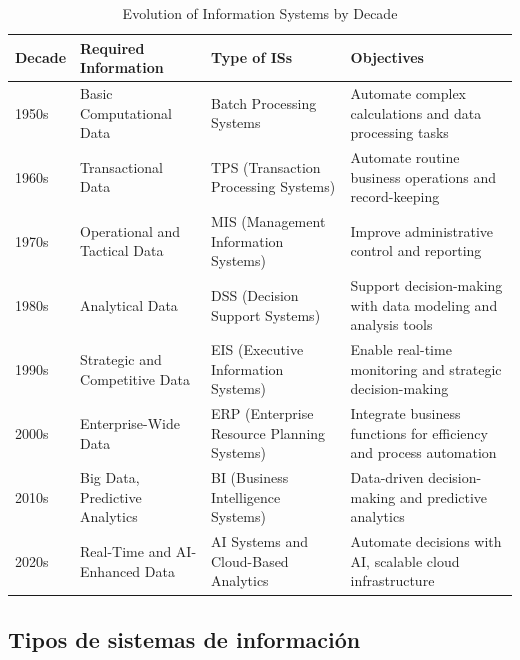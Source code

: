 \begin{table}[ht]
\centering
\begin{tabular}{p{1.5cm}p{3.5cm}p{3.5cm}p{4cm}}
\hline
\rowcolor{gray!50}
\textbf{Decade} & \textbf{Required Information} & \textbf{Type of ISs} & \textbf{Objectives} \\ \hline
\footnotesize 1950s & \footnotesize Basic Computational Data & \footnotesize Batch Processing Systems & \footnotesize Automate complex calculations and data processing tasks \\ \hline
\rowcolor{gray!10} \footnotesize 1960s & \footnotesize Transactional Data & \footnotesize TPS (Transaction Processing Systems) & \footnotesize Automate routine business operations and record-keeping \\ \hline
\footnotesize 1970s & \footnotesize Operational and Tactical Data & \footnotesize MIS (Management Information Systems) & \footnotesize Improve administrative control and reporting \\ \hline
\rowcolor{gray!10}\footnotesize 1980s & \footnotesize Analytical Data & \footnotesize DSS (Decision Support Systems) & \footnotesize Support decision-making with data modeling and analysis tools \\ \hline
\footnotesize 1990s & \footnotesize Strategic and Competitive Data & \footnotesize EIS (Executive Information Systems) & \footnotesize Enable real-time monitoring and strategic decision-making \\ \hline
\rowcolor{gray!10}\footnotesize 2000s & \footnotesize Enterprise-Wide Data & \footnotesize ERP (Enterprise Resource Planning Systems) & \footnotesize Integrate business functions for efficiency and process automation \\ \hline
\footnotesize 2010s & \footnotesize Big Data, Predictive Analytics & \footnotesize BI (Business Intelligence Systems) & \footnotesize Data-driven decision-making and predictive analytics \\ \hline
\rowcolor{gray!10}\footnotesize 2020s & \footnotesize Real-Time and AI-Enhanced Data & \footnotesize AI Systems and Cloud-Based Analytics & \footnotesize Automate decisions with AI, scalable cloud infrastructure \\ \hline
\end{tabular}
\caption{Evolution of Information Systems by Decade}
\end{table}

\subsection{Tipos de sistemas de información}


